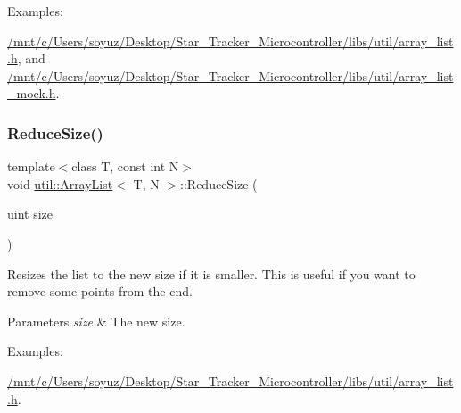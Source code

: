 \begin{Desc}
\item[Examples\+: ]\par
\hyperlink{_2mnt_2c_2Users_2soyuz_2Desktop_2Star_Tracker_Microcontroller_2libs_2util_2array_list_8h-example}{/mnt/c/\+Users/soyuz/\+Desktop/\+Star\+\_\+\+Tracker\+\_\+\+Microcontroller/libs/util/array\+\_\+list.\+h}, and \hyperlink{_2mnt_2c_2Users_2soyuz_2Desktop_2Star_Tracker_Microcontroller_2libs_2util_2array_list_mock_8h-example}{/mnt/c/\+Users/soyuz/\+Desktop/\+Star\+\_\+\+Tracker\+\_\+\+Microcontroller/libs/util/array\+\_\+list\+\_\+mock.\+h}.\end{Desc}
\mbox{\label{classutil_1_1ArrayList_abd8439644f4bff823f69a3ba9a6b66ca}} 
\subsubsection{\texorpdfstring{Reduce\+Size()}{ReduceSize()}}
{\footnotesize\ttfamily template$<$class T, const int N$>$ \\
void \hyperlink{classutil_1_1ArrayList}{util\+::\+Array\+List}$<$ T, N $>$\+::Reduce\+Size (\begin{DoxyParamCaption}\item[{uint}]{size }\end{DoxyParamCaption})\hspace{0.3cm}{\ttfamily [inline]}}



Resizes the list to the new size if it is smaller. This is useful if you want to remove some points from the end. 


\begin{DoxyParams}{Parameters}
{\em size} & The new size. \\
\hline
\end{DoxyParams}
\begin{Desc}
\item[Examples\+: ]\par
\hyperlink{_2mnt_2c_2Users_2soyuz_2Desktop_2Star_Tracker_Microcontroller_2libs_2util_2array_list_8h-example}{/mnt/c/\+Users/soyuz/\+Desktop/\+Star\+\_\+\+Tracker\+\_\+\+Microcontroller/libs/util/array\+\_\+list.\+h}.\end{Desc}
\mbox{\label{classutil_1_1ArrayList_ae098e879892c23b682edc4b023a770de}} 
